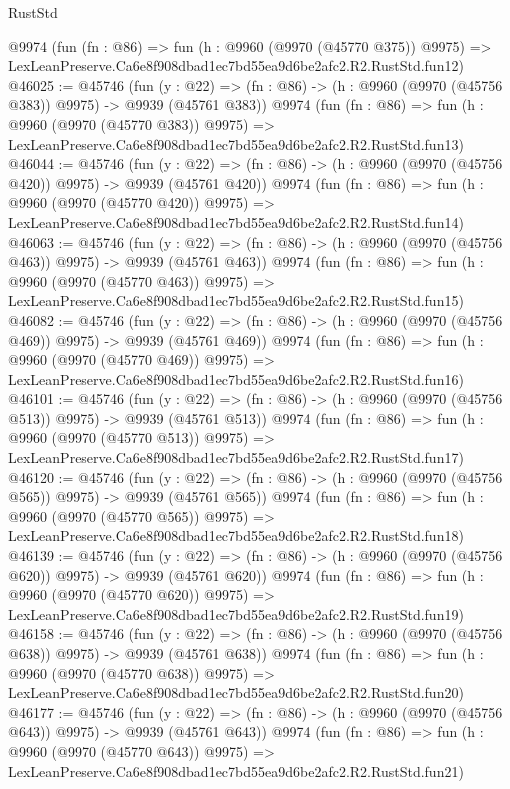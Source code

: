 \begin{lexlean}{RustStd}
\begin{coremodule}
    @9974
    (fun (fn : @86) =>
    fun (h : @9960 (@9970 (@45770 @375)) @9975) =>
    LexLeanPreserve.Ca6e8f908dbad1ec7bd55ea9d6be2afc2.R2.RustStd.fun12)
@46025 := @45746
    (fun (y : @22) => (fn : @86) -> (h : @9960 (@9970 (@45756 @383)) @9975) -> @9939 (@45761 @383))
    @9974
    (fun (fn : @86) =>
    fun (h : @9960 (@9970 (@45770 @383)) @9975) =>
    LexLeanPreserve.Ca6e8f908dbad1ec7bd55ea9d6be2afc2.R2.RustStd.fun13)
@46044 := @45746
    (fun (y : @22) => (fn : @86) -> (h : @9960 (@9970 (@45756 @420)) @9975) -> @9939 (@45761 @420))
    @9974
    (fun (fn : @86) =>
    fun (h : @9960 (@9970 (@45770 @420)) @9975) =>
    LexLeanPreserve.Ca6e8f908dbad1ec7bd55ea9d6be2afc2.R2.RustStd.fun14)
@46063 := @45746
    (fun (y : @22) => (fn : @86) -> (h : @9960 (@9970 (@45756 @463)) @9975) -> @9939 (@45761 @463))
    @9974
    (fun (fn : @86) =>
    fun (h : @9960 (@9970 (@45770 @463)) @9975) =>
    LexLeanPreserve.Ca6e8f908dbad1ec7bd55ea9d6be2afc2.R2.RustStd.fun15)
@46082 := @45746
    (fun (y : @22) => (fn : @86) -> (h : @9960 (@9970 (@45756 @469)) @9975) -> @9939 (@45761 @469))
    @9974
    (fun (fn : @86) =>
    fun (h : @9960 (@9970 (@45770 @469)) @9975) =>
    LexLeanPreserve.Ca6e8f908dbad1ec7bd55ea9d6be2afc2.R2.RustStd.fun16)
@46101 := @45746
    (fun (y : @22) => (fn : @86) -> (h : @9960 (@9970 (@45756 @513)) @9975) -> @9939 (@45761 @513))
    @9974
    (fun (fn : @86) =>
    fun (h : @9960 (@9970 (@45770 @513)) @9975) =>
    LexLeanPreserve.Ca6e8f908dbad1ec7bd55ea9d6be2afc2.R2.RustStd.fun17)
@46120 := @45746
    (fun (y : @22) => (fn : @86) -> (h : @9960 (@9970 (@45756 @565)) @9975) -> @9939 (@45761 @565))
    @9974
    (fun (fn : @86) =>
    fun (h : @9960 (@9970 (@45770 @565)) @9975) =>
    LexLeanPreserve.Ca6e8f908dbad1ec7bd55ea9d6be2afc2.R2.RustStd.fun18)
@46139 := @45746
    (fun (y : @22) => (fn : @86) -> (h : @9960 (@9970 (@45756 @620)) @9975) -> @9939 (@45761 @620))
    @9974
    (fun (fn : @86) =>
    fun (h : @9960 (@9970 (@45770 @620)) @9975) =>
    LexLeanPreserve.Ca6e8f908dbad1ec7bd55ea9d6be2afc2.R2.RustStd.fun19)
@46158 := @45746
    (fun (y : @22) => (fn : @86) -> (h : @9960 (@9970 (@45756 @638)) @9975) -> @9939 (@45761 @638))
    @9974
    (fun (fn : @86) =>
    fun (h : @9960 (@9970 (@45770 @638)) @9975) =>
    LexLeanPreserve.Ca6e8f908dbad1ec7bd55ea9d6be2afc2.R2.RustStd.fun20)
@46177 := @45746
    (fun (y : @22) => (fn : @86) -> (h : @9960 (@9970 (@45756 @643)) @9975) -> @9939 (@45761 @643))
    @9974
    (fun (fn : @86) =>
    fun (h : @9960 (@9970 (@45770 @643)) @9975) =>
    LexLeanPreserve.Ca6e8f908dbad1ec7bd55ea9d6be2afc2.R2.RustStd.fun21)

\end{coremodule}
\end{lexlean}
